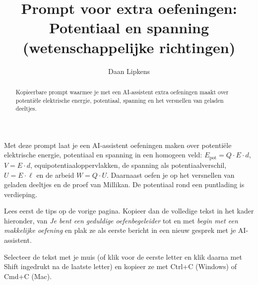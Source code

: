 \documentclass{ximera}
\title{Prompt voor extra oefeningen: Potentiaal en spanning (wetenschappelijke richtingen)}
\author{Daan Lipkens}
\begin{document}
\begin{abstract}
    Kopieerbare prompt waarmee je met een AI-assistent extra oefeningen maakt over potentiële elektrische energie, potentiaal, spanning en het versnellen van geladen deeltjes.
\end{abstract}
\maketitle

Met deze prompt laat je een AI-assistent oefeningen maken over potentiële elektrische energie, potentiaal en spanning in een homogeen veld: $E_{\text{pot}} = Q \cdot E \cdot d$, $V = E \cdot d$, equipotentiaaloppervlakken, de spanning als potentiaalverschil, $U = E \cdot \ell$ en de arbeid $W = Q \cdot U$. Daarnaast oefen je op het versnellen van geladen deeltjes en de proef van Millikan. De potentiaal rond een puntlading is verdieping.

Lees eerst de tips op de vorige pagina. Kopieer dan de volledige tekst in het kader hieronder, van \textit{Je bent een geduldige oefenbegeleider} tot en met \textit{begin met een makkelijke oefening} en plak ze als eerste bericht in een nieuw gesprek met je AI-assistent.

\begin{onlineOnly}
    Selecteer de tekst met je muis (of klik voor de eerste letter en klik daarna met Shift ingedrukt na de laatste letter) en kopieer ze met Ctrl+C (Windows) of Cmd+C (Mac).
\end{onlineOnly}
\end{document}
